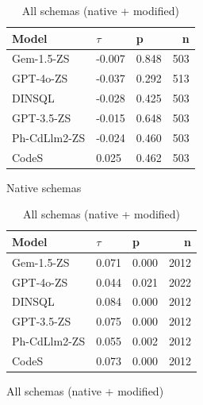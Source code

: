\begin{table}
  \centering
  \caption{Kendall-Tau ($\tau$) Correlations between \emph{Low Identifier Proportion} and \emph{Query Recall}.}
  \begin{subfigure}{.5\linewidth}
      \centering
      \caption{Native schemas}
      \begin{tabular}{lllr}
\toprule
Model & $\tau$ & p & n \\
\midrule
Gem-1.5-ZS & -0.007 & 0.848 & 503 \\
GPT-4o-ZS & -0.037 & 0.292 & 513 \\
DINSQL & -0.028 & 0.425 & 503 \\
GPT-3.5-ZS & -0.015 & 0.648 & 503 \\
Ph-CdLlm2-ZS & -0.024 & 0.460 & 503 \\
CodeS & 0.025 & 0.462 & 503 \\
\bottomrule
\end{tabular}

      \label{table:natmedium-recall-ktau-native}
  \end{subfigure}%
  \begin{subfigure}{.5\linewidth}
      \centering
      \caption{All schemas (native + modified)}
      \begin{tabular}{lllr}
\toprule
Model & $\tau$ & p & n \\
\midrule
Gem-1.5-ZS & 0.071 & 0.000 & 2012 \\
GPT-4o-ZS & 0.044 & 0.021 & 2022 \\
DINSQL & 0.084 & 0.000 & 2012 \\
GPT-3.5-ZS & 0.075 & 0.000 & 2012 \\
Ph-CdLlm2-ZS & 0.055 & 0.002 & 2012 \\
CodeS & 0.073 & 0.000 & 2012 \\
\bottomrule
\end{tabular}

      \label{table:natmedium-recall-ktau-all}
  \end{subfigure}

\end{table}

